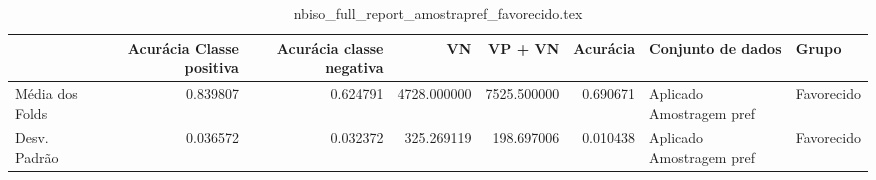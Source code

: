 \begin{table}
\centering
\caption{nbiso_full_report_amostrapref_favorecido.tex}
\label{nbiso_full_report_amostrapref_favorecido.tex}
\begin{tabular}{lrrrrrll}
\toprule
{}              &  Acurácia Classe positiva &  Acurácia classe negativa &          VN  &     VP + VN  &  Acurácia &         Conjunto de dados &       Grupo \\
\midrule
Média dos Folds &                  0.839807 &                  0.624791 &  4728.000000 &  7525.500000 &  0.690671 &  Aplicado Amostragem pref &  Favorecido \\
Desv. Padrão    &                  0.036572 &                  0.032372 &   325.269119 &   198.697006 &  0.010438 &  Aplicado Amostragem pref &  Favorecido \\
\bottomrule
\end{tabular}
\end{table}
